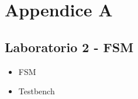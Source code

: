 \documentclass[11pt,  english, makeidx, a4paper, titlepage, oneside]{book}
\newenvironment{listato}{\footnotesize} {\normalsize }
\begin{document}
\chapter{Appendice A}
\section{Laboratorio 2 - FSM}
\begin{itemize}
\item FSM
\begin{center}
\begin{listato}
	\centerline{}
\end{listato}
\end{center}
\newpage
\begin{center}
\begin{listato}
	\centerline{}
\end{listato}
\end{center}
\newpage
\item Testbench
\begin{center}
\begin{listato}
	\centerline{}
\end{listato}
\end{center}
\end{itemize}
\end{document}
